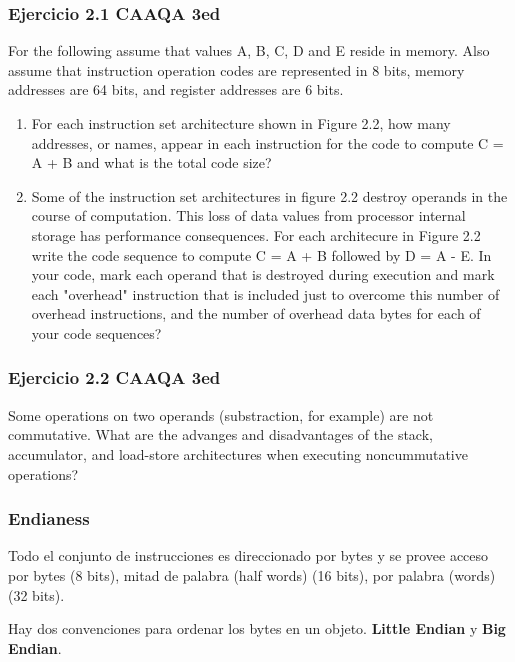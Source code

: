 \documentclass{beamer}
\begin{document}
\begin{frame}
 \frametitle{Ejercicio 2.1 CAAQA 3ed}
 
For the following assume that values A, B, C, D and E reside in memory. Also assume that instruction operation codes are represented in 8 bits, memory addresses are 64 bits, and register addresses are 6 bits.

\begin{enumerate}[a]
 \item For each instruction set architecture shown in Figure 2.2, how many addresses, or names, appear in each instruction for the code to compute C = A + B and what is the total code size?

 \item Some of the instruction set architectures in figure 2.2 destroy operands in the course of computation. This loss of data values from processor internal storage has performance consequences. For each architecure in Figure 2.2 write the code sequence to compute C = A + B followed by D = A - E. In your code, mark each operand that is destroyed during execution and mark each "overhead" instruction that is included just to overcome this number of overhead instructions, and the number of overhead data bytes for each of your code sequences?
\end{enumerate}
\end{frame}

\begin{frame}
 \frametitle{Ejercicio 2.2 CAAQA 3ed}
 Some operations on two operands (substraction, for example) are not commutative. What are the advanges and disadvantages of the stack, accumulator, and load-store architectures when executing noncummutative operations?
\end{frame}


\begin{frame}
 \frametitle{Endianess}
Todo el conjunto de instrucciones es direccionado por bytes y se provee acceso por bytes (8 bits), mitad de palabra (half words) (16 bits), por palabra (words) (32 bits).

\bigskip

Hay dos convenciones para ordenar los bytes en un objeto. \textbf{Little Endian} y \textbf{Big Endian}.
 \end{frame}
 
\end{document}
